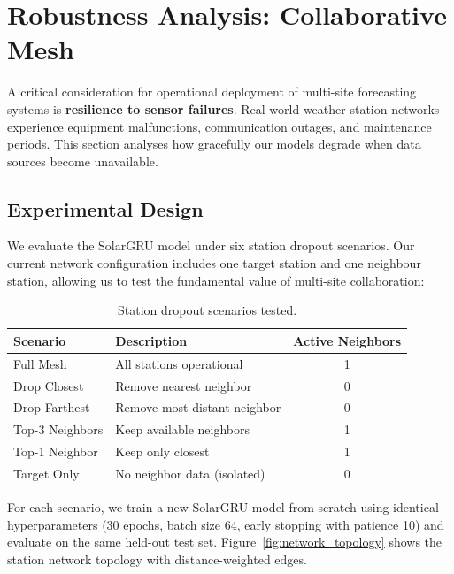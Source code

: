 \documentclass[11pt,a4paper]{article}
\begin{document}
\section{Robustness Analysis: Collaborative Mesh}
\label{sec:robustness}

A critical consideration for operational deployment of multi-site forecasting systems is \textbf{resilience to sensor failures}. Real-world weather station networks experience equipment malfunctions, communication outages, and maintenance periods. This section analyses how gracefully our models degrade when data sources become unavailable.

\subsection{Experimental Design}

We evaluate the SolarGRU model under six station dropout scenarios. Our current network configuration includes one target station and one neighbour station, allowing us to test the fundamental value of multi-site collaboration:

\begin{table}[H]
\centering
\caption{Station dropout scenarios tested.}
\label{tab:dropout_scenarios}
\begin{tabular}{llc}
\toprule
\textbf{Scenario} & \textbf{Description} & \textbf{Active Neighbors} \\
\midrule
Full Mesh & All stations operational & 1 \\
Drop Closest & Remove nearest neighbor & 0 \\
Drop Farthest & Remove most distant neighbor & 0 \\
Top-3 Neighbors & Keep available neighbors & 1 \\
Top-1 Neighbor & Keep only closest & 1 \\
Target Only & No neighbor data (isolated) & 0 \\
\bottomrule
\end{tabular}
\end{table}

For each scenario, we train a new SolarGRU model from scratch using identical hyperparameters (30 epochs, batch size 64, early stopping with patience 10) and evaluate on the same held-out test set. Figure~\ref{fig:network_topology} shows the station network topology with distance-weighted edges.
\end{document}
